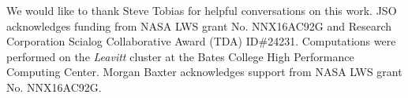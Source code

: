 \documentclass[aps,prl,reprint,superscriptaddress]{revtex4-1}
\begin{document}

%



\begin{acknowledgments}
We would like to thank Steve Tobias for helpful conversations on this work.
JSO acknowledges funding from NASA LWS grant No. NNX16AC92G and Research Corporation Scialog Collaborative Award (TDA) ID\#24231. Computations were performed on the \emph{Leavitt} cluster at the Bates College High Performance Computing Center.
Morgan Baxter acknowledges support from NASA LWS grant No. NNX16AC92G.
\end{acknowledgments}


\end{document}
